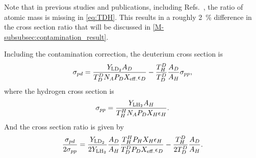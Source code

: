 \documentclass[../main.tex]{subfiles}
\begin{document}
Note that in previous studies and publications, including Refs.~\cite{dove2021,dove2023},
the ratio of atomic mass is missing in \cref{eq:TDH}.
This results in a roughly \SI{2}{\percent} difference in the cross section ratio
that will be discussed in \cref{M-subsubsec:contamination_result}.

Including the contamination correction, the deuterium cross section is
\begin{equation}
	\sigma_{pd} = \frac{Y_{\ce{LD_2}} A_D}{T_D^D N_A P_D X_{\mathrm{eff.}} \epsilon_D} - \frac{T^D_H}{T_D^D} \frac{A_D}{A_H} \sigma_{pp},
\end{equation}
where the hydrogen cross section is
\begin{equation}
	\sigma_{pp} = \frac{Y_{\ce{LH_2}} A_H}{T_H^H N_A P_D X_{H} \epsilon_H}.
\end{equation}
And the cross section ratio is given by
\begin{equation}
	\frac{\sigma_{pd}}{2\sigma_{pp}} = \frac{Y_{\ce{LD_2}}}{2Y_{\ce{LH_2}}}\frac{A_D}{A_H}\frac{T_H^H P_H X_{H} \epsilon_H}{T_D^D P_D X_{\mathrm{eff.}} \epsilon_D} - \frac{T^D_H}{2T_D^D} \frac{A_D}{A_H}.
\end{equation}
\end{document}

